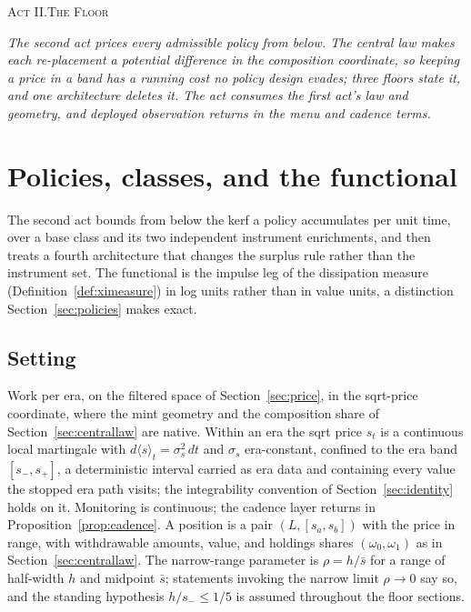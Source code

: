 \documentclass[11pt,a4paper]{article}
\theoremstyle{definition}
\theoremstyle{plain}
\theoremstyle{remark}
\newcommand{\actdivider}[2]{%
  \par\vspace{18pt plus 4pt minus 2pt}%
  \begin{center}{\fontsize{12.5pt}{15pt}\selectfont\scshape #1.\quad #2}\end{center}%
  \vspace{2pt}}
\begin{document}
\actdivider{Act II}{The Floor}

\noindent\emph{The second act prices every admissible policy from below. The central law makes each re-placement a potential difference in the composition coordinate, so keeping 
a price in a band has a running cost no policy design evades; three floors state it, and one architecture deletes it. The act consumes the first act's law and geometry, and deployed
observation returns in the menu and cadence terms.}

\section{Policies, classes, and the functional}\label{sec:classes}\label{sec:floor}

The second act bounds from below the kerf a policy accumulates per unit time, over a base class and its two independent instrument enrichments, and then treats a fourth architecture 
that changes the surplus rule rather than the instrument set. The functional is the impulse leg of the dissipation measure (Definition~\ref{def:ximeasure}) in log units rather than 
in value units, a distinction Section~\ref{sec:policies} makes exact.

\subsection{Setting}\label{sec:setup}

Work per era, on the filtered space of Section~\ref{sec:price}, in the sqrt-price coordinate, where the mint geometry and the composition share of Section~\ref{sec:centrallaw} are 
native. Within an era the sqrt price $s_t$ is a continuous local martingale with $d\langle s \rangle_t = \sigma_s^2\, dt$ and $\sigma_s$ era-constant, confined to the era 
band $[s_-, s_+]$, a deterministic interval carried as era data and containing every value the stopped era path visits; the integrability convention of Section~\ref{sec:identity} 
holds on it. Monitoring is continuous; the cadence layer returns in Proposition~\ref{prop:cadence}. A position is a pair $(L, [s_a, s_b])$ with the price in range, with withdrawable 
amounts, value, and holdings shares $(\omega_0, \omega_1)$ as in Section~\ref{sec:centrallaw}. The narrow-range parameter is $\rho = h/\bar s$ for a range of half-width $h$ and midpoint 
$\bar s$; statements invoking the narrow limit $\rho \to 0$ say so, and the standing hypothesis $h/s_- \le 1/5$ is assumed throughout the floor sections.
\end{document}

